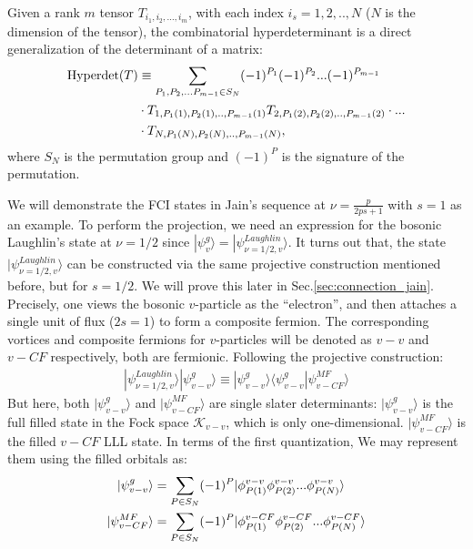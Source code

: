 Given a rank $m$ tensor $T_{i_1,i_2,...,i_m}$, with each index $i_s = 1,2,..,N$ ($N$ is the dimension of the tensor), the combinatorial hyperdeterminant \cite{gelfand1994hyperdeterminants} is a direct generalization of the determinant of a matrix:
\begin{align}
    \text{Hyperdet}(T) & \equiv \sum_{P_1,P_2,...P_{m-1}\in S_N} (-1)^{P_1}(-1)^{P_2}...(-1)^{P_{m-1}} \notag    \\
                       & \cdot T_{1,P_1(1),P_2(1),..,P_{m-1}(1)}T_{2,P_1(2),P_2(2),..,P_{m-1}(2)}\cdot ...\notag \\
                       & \cdot T_{N,P_1(N),P_2(N),..,P_{m-1}(N)},
\end{align}
where $S_N$ is the permutation group and $(-1)^P$ is the signature of the permutation.

We will demonstrate the FCI states in Jain's sequence at $\nu=\frac{p}{2ps+1}$ with $s=1$ as an example. To perform the projection, we need an expression for the bosonic Laughlin's state at $\nu=1/2$ since $|\psi^g_v\rangle=|\psi^{Laughlin}_{\nu=1/2,v}\rangle$. It turns out that, the state $|\psi^{Laughlin}_{\nu=1/2,v}\rangle$ can be constructed via the same projective construction mentioned before, but for $s=1/2$. We will prove this later in Sec.\ref{sec:connection_jain}. Precisely, one views the bosonic $v$-particle as the ``electron'', and then attaches a single unit of flux ($2s=1$) to form a composite fermion. The corresponding vortices and composite fermions for $v$-particles will be denoted as $v-v$ and $v-CF$ respectively, both are fermionic. Following the projective construction:
\begin{align}
    |\psi^{Laughlin}_{\nu=1/2,v}\rangle | \psi^g_{v-v}\rangle \equiv|\psi^g_{v-v}\rangle\langle \psi^g_{v-v}|\psi^{MF}_{v-CF}\rangle
\end{align}
But here, both $|\psi^g_{v-v}\rangle$ and $|\psi^{MF}_{v-CF}\rangle$ are single slater determinants: $|\psi^g_{v-v}\rangle$ is the full filled state in the Fock space $\mathcal K_{v-v}$, which is only one-dimensional. $|\psi^{MF}_{v-CF}\rangle$ is the filled $v-CF$ LLL state. In terms of the first quantization, We may represent them using the filled orbitals as:
\begin{align}
    |\psi^g_{v-v}\rangle     & =\sum_{P\in S_N} (-1)^P |\phi^{v-v}_{P(1)}\phi^{v-v}_{P(2)}...\phi^{v-v}_{P(N)}\rangle\notag    \\
    |\psi^{MF}_{v-CF}\rangle & =\sum_{P\in S_N} (-1)^P |\phi^{v-CF}_{P(1)}\phi^{v-CF}_{P(2)}...\phi^{v-CF}_{P(N)}\rangle\notag \\
\end{align}
